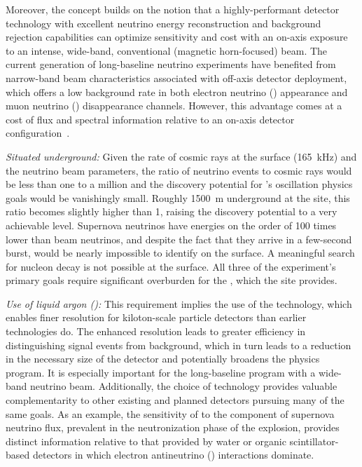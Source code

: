 Moreover, the  concept
    builds on the notion that a highly-performant detector technology  
    with excellent neutrino energy reconstruction
    and background rejection capabilities can
    optimize sensitivity and cost with an on-axis exposure to
    an intense, wide-band, conventional (magnetic horn-focused) beam.
   The current generation of long-baseline neutrino experiments
	have benefited from narrow-band beam characteristics 
	associated with off-axis detector deployment, which offers 
	a low background rate in both electron neutrino (\nue) appearance 
	and muon neutrino (\numu) disappearance channels. 
	However, this advantage comes at a cost of flux and 
	spectral information relative to an on-axis detector 
    configuration~\cite{Adams:2013qkq,Agarwalla:2014tca}.
    

\textit{Situated underground:}
Given the rate of cosmic rays at the surface (\SI{165}{kHz}) and the neutrino beam parameters, the ratio of neutrino events to cosmic rays would be less than one to a million and the discovery potential for 's oscillation physics goals would be vanishingly small.  Roughly \SI{1500}{m} underground at the  site, this ratio becomes slightly higher than 1, raising the discovery potential to a very achievable level.  Supernova neutrinos have energies on the order of \num{100} times lower than beam neutrinos, and despite the fact that they arrive in a few-second burst, would be nearly impossible to identify on the surface. A meaningful search for nucleon decay is not possible at the surface. All three of the experiment's primary goals require significant overburden for the , which the  site provides. 

\textit{Use of liquid argon (\lar):}
This requirement implies the use of the  technology, which enables finer resolution for kiloton-scale particle
detectors than earlier technologies do. The enhanced resolution leads to greater efficiency in distinguishing signal events from background, which in turn leads to a reduction in the necessary size of the detector and potentially broadens the physics program.
    It is especially important for the long-baseline program with a    
    wide-band neutrino beam.
    Additionally, the choice of  technology provides 
    valuable complementarity to other 
    existing and planned detectors pursuing many
    of the same goals.  As an example,
    the sensitivity of  to the \nue component of supernova 
    neutrino flux, prevalent in the neutronization phase of the 
    explosion, provides distinct information relative to that 
    provided by water or organic scintillator-based detectors in 
    which electron antineutrino (\anue) interactions dominate. 

